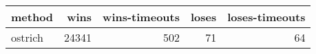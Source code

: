 \begin{tabular}{lrrrr}
\hline
 method   &   wins &   wins-timeouts &   loses &   loses-timeouts \\
\hline
 ostrich  &  24341 &             502 &      71 &               64 \\
\hline
\end{tabular}

